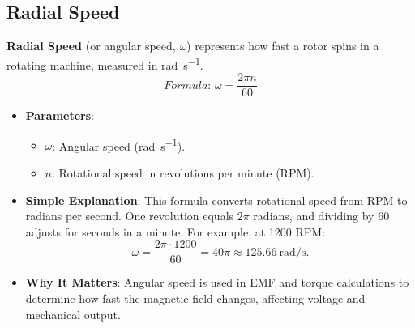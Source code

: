 \documentclass[12pt]{article}
\newcommand{\concept}[1]{\textbf{#1}}
\newcommand{\formula}[1]{\textit{Formula: }#1}
\begin{document}
\subsection{Radial Speed}
\concept{Radial Speed} (or angular speed, \(\omega\)) represents how fast a rotor spins in a rotating machine, measured in \si{\radian\per\second}.
\[
\formula{\omega = \frac{2 \pi n}{60}}
\]
\begin{itemize}
    \item \textbf{Parameters}:
        \begin{itemize}
            \item \(\omega\): Angular speed (\si{\radian\per\second}).
            \item \(n\): Rotational speed in revolutions per minute (RPM).
        \end{itemize}
    \item \textbf{Simple Explanation}: This formula converts rotational speed from RPM to radians per second. One revolution equals \(2\pi\) radians, and dividing by 60 adjusts for seconds in a minute. For example, at 1200 RPM:
        \[
        \omega = \frac{2 \pi \cdot 1200}{60} = 40\pi \approx \SI{125.66}{\radian\per\second}.
        \]
    \item \textbf{Why It Matters}: Angular speed is used in EMF and torque calculations to determine how fast the magnetic field changes, affecting voltage and mechanical output.
\end{itemize}
\end{document}
